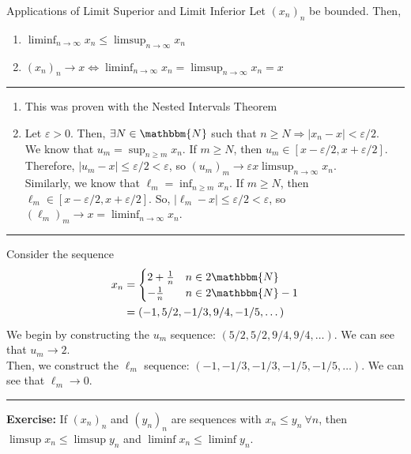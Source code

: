 \documentclass[10pt]{extarticle}
\newcommand{\N}{\mathbbm{N}}
\begin{document}
  \begin{problem}{Applications of Limit Superior and Limit Inferior}
    Let $(x_n)_n$ be bounded. Then,
    \begin{enumerate}[(1)]
      \item $\displaystyle \liminf_{n\rightarrow\infty} x_n \leq \limsup_{n\rightarrow\infty} x_n$
      \item $\displaystyle (x_n)_n\rightarrow x \Leftrightarrow \liminf_{n\rightarrow\infty}x_n = \limsup_{n\rightarrow\infty}x_n = x$
    \end{enumerate}
    \vspace{4pt}
    \rule{\textwidth}{0.4pt}
    \vspace{4pt}
    \begin{enumerate}[(1)]
      \item This was proven with the Nested Intervals Theorem
      \item Let $\varepsilon > 0$. Then, $\exists N \in\N$ such that $n\geq N \Rightarrow |x_n - x| < \varepsilon/2$.\\

        We know that $u_m = \sup_{n\geq m}x_n$. If $m\geq N$, then $u_m \in [x-\varepsilon/2,x+\varepsilon/2]$. Therefore, $|u_m-x| \leq \varepsilon/2 < \varepsilon$, so $(u_m)_m \rightarrow \varepsilon x \limsup_{n\rightarrow\infty}x_n$.\\

        Similarly, we know that $\ell_m = \inf_{n\geq m}x_n$. If $m\geq N$, then $\ell_m \in [x-\varepsilon/2,x+\varepsilon/2]$. So, $|\ell_m - x| \leq \varepsilon/2 < \varepsilon$, so $(\ell_m)_m \rightarrow x = \liminf_{n\rightarrow\infty}x_n$.
    \end{enumerate}
    \vspace{4pt}
    \rule{\textwidth}{0.4pt}
    \vspace{4pt}
    Consider the sequence
    \begin{align*}
      x_n &= \begin{cases}
        2 + \frac{1}{n}&n\in2\N\\
        -\frac{1}{n}&n\in2\N-1
      \end{cases}\\
          &= (-1,5/2,-1/3,9/4,-1/5,\dots)
    \end{align*}
    We begin by constructing the $u_m$ sequence: $(5/2,5/2,9/4,9/4,\dots)$. We can see that $u_m \rightarrow 2$.\\

    Then, we construct the $\ell_m$ sequence: $(-1,-1/3,-1/3,-1/5,-1/5,\dots)$. We can see that $\ell_m\rightarrow 0$.\\
    \vspace{4pt}
    \rule{\textwidth}{0.4pt}
    \vspace{4pt}
    \textbf{Exercise:} If $(x_n)_n$ and $(y_n)_n$ are sequences with $x_n \leq y_n~\forall n$, then $\limsup x_n \leq \limsup y_n$ and $\liminf x_n \leq \liminf y_n$.
  \end{problem}
\end{document}
